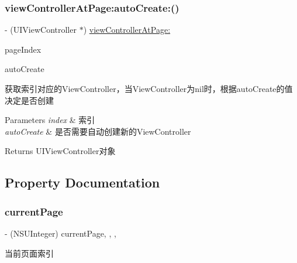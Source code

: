 \subsubsection{\texorpdfstring{view\+Controller\+At\+Page\+:auto\+Create\+:()}{viewControllerAtPage:autoCreate:()}\hspace{0.1cm}{\footnotesize\ttfamily [3/3]}}
{\footnotesize\ttfamily -\/ (U\+I\+View\+Controller $\ast$) \mbox{\hyperlink{interface_v_t_content_view_ae81362c80f8f700ad3c69d814da4ca9b}{view\+Controller\+At\+Page\+:}} \begin{DoxyParamCaption}\item[{(N\+S\+U\+Integer)}]{page\+Index }\item[{autoCreate:(B\+O\+OL)}]{auto\+Create }\end{DoxyParamCaption}}

获取索引对应的\+View\+Controller，当\+View\+Controller为nil时，根据auto\+Create的值决定是否创建


\begin{DoxyParams}{Parameters}
{\em index} & 索引 \\
\hline
{\em auto\+Create} & 是否需要自动创建新的\+View\+Controller\\
\hline
\end{DoxyParams}
\begin{DoxyReturn}{Returns}
U\+I\+View\+Controller对象 
\end{DoxyReturn}


\subsection{Property Documentation}
\mbox{\label{interface_v_t_content_view_a4d0fedfb357e71a397741884ebecd702}} 
\subsubsection{\texorpdfstring{current\+Page}{currentPage}}
{\footnotesize\ttfamily -\/ (N\+S\+U\+Integer) current\+Page\hspace{0.3cm}{\ttfamily [read]}, {\ttfamily [write]}, {\ttfamily [nonatomic]}, {\ttfamily [assign]}}

当前页面索引 \mbox{\label{interface_v_t_content_view_afc7b80ec9f8d5535075fd49c9a6418b7}} 
